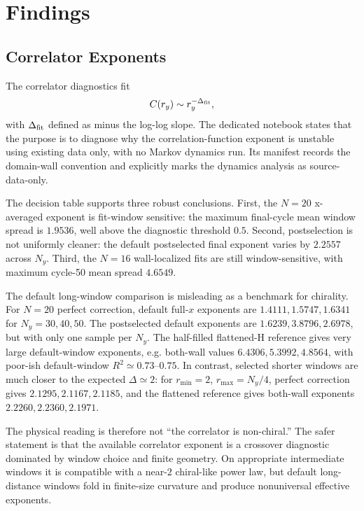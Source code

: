 \documentclass[aps,prb,onecolumn,nofootinbib,superscriptaddress]{revtex4-2}
\begin{document}
\section{Findings}

\subsection{\texorpdfstring{Correlator Exponents}{Correlator Exponents}}

The correlator diagnostics fit
\begin{equation}
  C(r_y) \sim r_y^{-\Delta_{\rm fit}},
\end{equation}
with \(\Delta_{\rm fit}\) defined as minus the log-log slope. The dedicated notebook states that the purpose is to diagnose why the correlation-function exponent is unstable using existing data only, with no Markov dynamics run. Its manifest records the domain-wall convention and explicitly marks the dynamics analysis as source-data-only.

The decision table supports three robust conclusions. First, the \(N=20\) x-averaged exponent is fit-window sensitive: the maximum final-cycle mean window spread is \(1.9536\), well above the diagnostic threshold \(0.5\). Second, postselection is not uniformly cleaner: the default postselected final exponent varies by \(2.2557\) across \(N_y\). Third, the \(N=16\) wall-localized fits are still window-sensitive, with maximum cycle-50 mean spread \(4.6549\).

The default long-window comparison is misleading as a benchmark for chirality. For \(N=20\) perfect correction, default full-\(x\) exponents are \(1.4111,1.5747,1.6341\) for \(N_y=30,40,50\). The postselected default exponents are \(1.6239,3.8796,2.6978\), but with only one sample per \(N_y\). The half-filled flattened-H reference gives very large default-window exponents, e.g. both-wall values \(6.4306,5.3992,4.8564\), with poor-ish default-window \(R^2\simeq 0.73\)--\(0.75\). In contrast, selected shorter windows are much closer to the expected \(\Delta\simeq 2\): for \(r_{\min}=2\), \(r_{\max}=N_y/4\), perfect correction gives \(2.1295,2.1167,2.1185\), and the flattened reference gives both-wall exponents \(2.2260,2.2360,2.1971\).

The physical reading is therefore not ``the correlator is non-chiral.'' The safer statement is that the available correlator exponent is a crossover diagnostic dominated by window choice and finite geometry. On appropriate intermediate windows it is compatible with a near-\(2\) chiral-like power law, but default long-distance windows fold in finite-size curvature and produce nonuniversal effective exponents.
\end{document}
